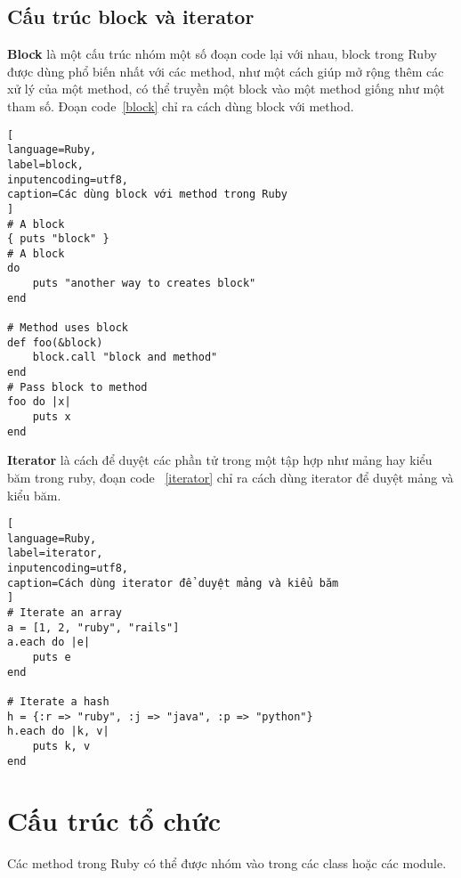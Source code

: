 \subsection{Cấu trúc block và iterator}
{\bf Block} là một cấu trúc nhóm một số đoạn code lại với nhau, block trong Ruby được dùng phổ biến nhất với các method, như một cách giúp mở rộng thêm các xử lý của một method, có thể truyền một block vào một method giống như một tham số. Đoạn code~\ref{block} chỉ ra cách dùng block với method.
\begin{lstlisting}[
language=Ruby,
label=block,
inputencoding=utf8,
caption=Các dùng block với method trong Ruby
]
# A block
{ puts "block" }
# A block
do
    puts "another way to creates block"
end

# Method uses block
def foo(&block)
    block.call "block and method"
end
# Pass block to method
foo do |x|
    puts x
end

\end{lstlisting}

{\bf Iterator} là cách để duyệt các phần tử trong một tập hợp như mảng hay kiểu băm trong ruby, đoạn code ~\ref{iterator} chỉ ra cách dùng iterator để duyệt mảng và kiểu băm.
\begin{lstlisting}[
language=Ruby,
label=iterator,
inputencoding=utf8,
caption=Cách dùng iterator để duyệt mảng và kiểu băm
]
# Iterate an array
a = [1, 2, "ruby", "rails"]
a.each do |e|
    puts e
end

# Iterate a hash
h = {:r => "ruby", :j => "java", :p => "python"}
h.each do |k, v|
    puts k, v
end

\end{lstlisting}

\section{Cấu trúc tổ chức}
Các method trong Ruby có thể được nhóm vào trong các class hoặc các module.
